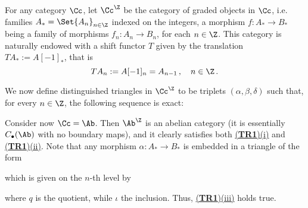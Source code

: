 \begin{ex}
    For any category $\Cc$, let $\Cc^{\Z}$ be the
    category of graded objects in $\Cc$, 
    i.e. families $A_{*} = \Set{A_{n}}_{n \in \Z}$ indexed
    on the integers, a morphism $f: A_* \to B_*$
    being a family of morphisms $f_{n} : A_{n} \to B_{n}$,
    for each $n \in \Z$. This category is naturally
    endowed with a shift functor $T$ given by the
    translation $TA_{*} := A[-1]_*$, that is
    \begin{equation*}
        TA_{n} := A[-1]_n = A_{n-1}\,,
        \quad n \in \Z\,.
    \end{equation*}

    We now define distinguished triangles in $\Cc^{\Z}$
    to be triplets $(\alpha,\beta,\delta)$ such
    that, for every $n \in \Z$, the following
    sequence is exact:
    \begin{center}
    \end{center}
    
    Consider now $\Cc = \Ab$. Then $\Ab^{\Z}$ is an abelian category
    (it is essentially $C_{\bullet}(\Ab)$ with no boundary maps),
    and it clearly satisfies both \hyperref[TR1]{(\textbf{TR1})(i)}
    and \hyperref[TR1]{(\textbf{TR1})(ii)}. Note that
    any morphism $\alpha:A_{*} \to B_{*}$ is embedded in a triangle
    of the form
    \begin{center}
    \end{center}
    which is given on the $n$-th level by
    \begin{center}
    \end{center}
    where $q$ is the quotient, while $\iota$ the inclusion. 
    Thus, \hyperref[TR1]{(\textbf{TR1})(iii)} holds true.


\end{ex}
